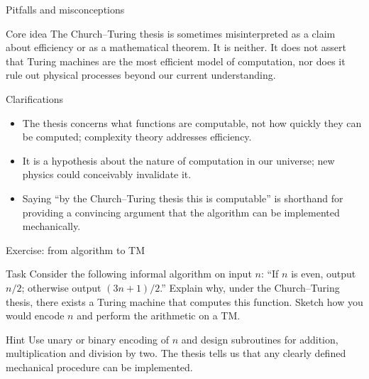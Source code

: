 \begin{frame}[t]{Pitfalls and misconceptions}
  \begin{tblock}{Core idea}
    The Church–Turing thesis is sometimes misinterpreted as a claim
    about efficiency or as a mathematical theorem.  It is neither.  It
    does not assert that Turing machines are the most efficient model
    of computation, nor does it rule out physical processes beyond
    our current understanding.
  \end{tblock}
  \begin{tblock}{Clarifications}
    \begin{itemize}
      \item The thesis concerns what functions are computable, not how
        quickly they can be computed; complexity theory addresses
        efficiency.
      \item It is a hypothesis about the nature of computation in our
        universe; new physics could conceivably invalidate it.
      \item Saying “by the Church–Turing thesis this is computable” is
        shorthand for providing a convincing argument that the
        algorithm can be implemented mechanically.
    \end{itemize}
  \end{tblock}
  \label{fr:7.6-07}
\end{frame}

\begin{frame}[t]{Exercise: from algorithm to TM}
  \begin{tblock}{Task}
    Consider the following informal algorithm on input $n$: “If $n$ is
    even, output $n/2$; otherwise output $(3n+1)/2$.”  Explain why,
    under the Church–Turing thesis, there exists a Turing machine that
    computes this function.  Sketch how you would encode $n$ and
    perform the arithmetic on a TM.
  \end{tblock}
  \begin{talert}{Hint}
    Use unary or binary encoding of $n$ and design subroutines for
    addition, multiplication and division by two.  The thesis tells us
    that any clearly defined mechanical procedure can be implemented.
  \end{talert}
  \label{fr:7.6-08}
\end{frame}

